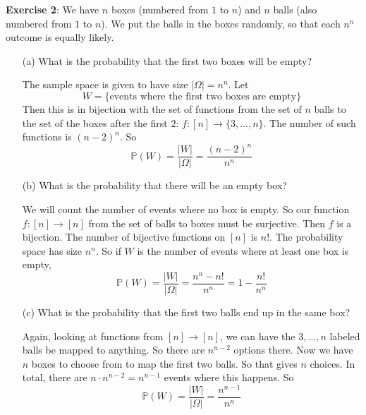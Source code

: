 \documentclass{article}
\begin{document}
\textbf{Exercise 2}: We have $n$ boxes (numbered from $1$ to $n$) and $n$ balls (also numbered from $1$ to $n$). We put the balls in the boxes randomly, so that each $n^{n}$ outcome is equally likely.
    \begin{itemize}
        \item [(a)] What is the probability that the first two boxes will be empty?
            \begin{answer}
                The sample space is given to have size $\lvert \Omega \rvert = n^{n}$. Let 
                    \begin{equation*}
                        W = \{\text{events where the first two boxes are empty}\}
                    \end{equation*}
                Then this is in bijection with the set of functions from the set of $n$ balls to the set of the boxes after the first $2$: $f : [n] \rightarrow \{3, \ldots, n\}$. The number of such functions is $(n - 2)^{n}$. So 
                    \begin{equation*}
                        \mathbb{P}(W) = \dfrac{\lvert W \rvert}{\lvert \Omega \rvert} = \dfrac{(n - 2)^{n}}{n^{n}}
                    \end{equation*}
            \end{answer}

        \item [(b)] What is the probability that there will be an empty box?
            \begin{answer}
                We will count the number of events where no box is empty. So our function $f: [n] \rightarrow [n]$ from the set of balls to boxes must be surjective. Then $f$ is a bijection. The number of bijective functions on $[n]$ is $n!$. The probability space has size $n^{n}$. So if $W$ is the number of events where at least one box is empty, 
                    \begin{equation*}
                        \mathbb{P}(W) = \dfrac{\lvert W \rvert}{\lvert \Omega \rvert} = \dfrac{n^{n} - n!}{n^{n}} = 1 - \dfrac{n!}{n^{n}}
                    \end{equation*}
            \end{answer}

        \item [(c)] What is the probability that the first two balls end up in the same box? 
            \begin{answer}
                Again, looking at functions from $[n] \rightarrow [n]$, we can have the $3, \ldots, n$ labeled balls be mapped to anything. So there are $n^{n - 2}$ options there. Now we have $n$ boxes to choose from to map the first two balls. So that gives $n$ choices. In total, there are $n \cdot n^{n - 2} = n^{n - 1}$ events where this happens. So 
                    \begin{equation*}
                        \mathbb{P}(W) = \dfrac{\lvert W \rvert}{\lvert \Omega \rvert} = \dfrac{n^{n - 1}}{n^{n}}
                    \end{equation*}
            \end{answer}
    \end{itemize}
\end{document}
